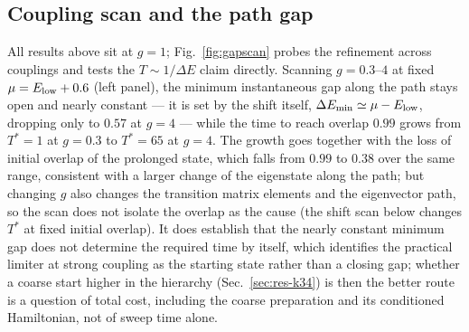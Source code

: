\documentclass[
  aps,            %
  prc,            %
  reprint,        %
  superscriptaddress,
  floatfix,
  nofootinbib
]{revtex4-2}
\begin{document}
\subsection{Coupling scan and the path gap}
\label{sec:res-gscan}
All results above sit at $g=1$; Fig.~\ref{fig:gapscan} probes the refinement
across couplings and tests the $T\sim1/\Delta E$ claim directly.  Scanning
$g=0.3$--$4$ at fixed $\mu=E_{\rm low}+0.6$ (left panel), the minimum
instantaneous gap along the path stays open and nearly constant --- it is set by
the shift itself, $\Delta E_{\min}\simeq\mu-E_{\rm low}$, dropping only to
$0.57$ at $g=4$ --- while the time to reach overlap $0.99$ grows from
$T^{*}=1$ at $g=0.3$ to $T^{*}=65$ at $g=4$.  The growth goes together with
the loss of initial overlap of the prolonged state, which falls from $0.99$
to $0.38$ over the same range, consistent with a larger change of the
eigenstate along the path; but changing $g$ also changes the transition
matrix elements and the eigenvector path, so the scan does not isolate the
overlap as the cause (the shift scan below changes $T^{*}$ at fixed initial
overlap).  It does establish that the nearly constant minimum gap does not
determine the required time by itself, which identifies the practical
limiter at strong coupling as the starting state rather than a closing gap;
whether a coarse start higher in the hierarchy (Sec.~\ref{sec:res-k34}) is
then the better route is a question of total cost, including the coarse
preparation and its conditioned Hamiltonian, not of sweep time alone.
\end{document}
